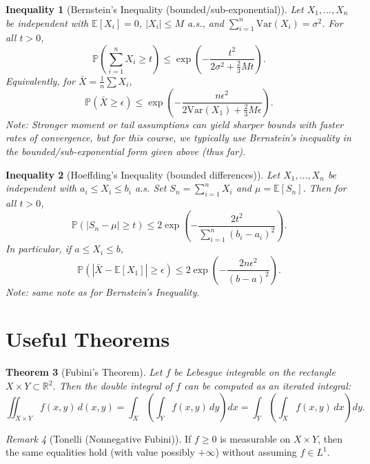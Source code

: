 \documentclass[11pt]{article}
\theoremstyle{plain}
\newtheorem{theorem}{Theorem}[section]
\newtheorem{inequality}[theorem]{Inequality}
\theoremstyle{definition}
\theoremstyle{remark}
\newtheorem{remark}[theorem]{Remark}
\newcommand{\E}{\mathbb{E}}
\newcommand{\Var}{\mathrm{Var}}
\newcommand{\1}{\mathbbm{1}}
\begin{document}
\vspace{1em}

\begin{inequality}[Bernstein’s Inequality (bounded/sub-exponential)]
Let $X_1,\dots,X_n$ be independent with $\E[X_i]=0$, $|X_i|\le M$ a.s., and $\sum_{i=1}^n \Var(X_i)=\sigma^2$. For all $t>0$,
\[
\mathbb{P}\!\left(\sum_{i=1}^n X_i \ge t\right)
\le \exp\!\left(-\frac{t^2}{2\sigma^2 + \tfrac{2}{3}Mt}\right).
\]
Equivalently, for $\bar X=\tfrac1n\sum X_i$,
\[
\mathbb{P}\!\left(\bar X \ge \epsilon\right)
\le \exp\!\left(-\frac{n\epsilon^2}{2\Var(X_1)+ \tfrac{2}{3}M\epsilon}\right).
\]
\noindent Note: Stronger moment or tail assumptions can yield sharper bounds with faster rates of convergence, but for this course, we typically use Bernstein’s inequality in the bounded/sub-exponential form given above (thus far).
\end{inequality}

\vspace{1em}

\begin{inequality}[Hoeffding’s Inequality (bounded differences)]
Let $X_1,\dots,X_n$ be independent with $a_i\le X_i\le b_i$ a.s. Set $S_n=\sum_{i=1}^n X_i$ and $\mu=\E[S_n]$. Then for all $t>0$,
\[
\mathbb{P}\!\left(|S_n-\mu|\ge t\right)
\le 2\exp\!\left(-\frac{2t^2}{\sum_{i=1}^n (b_i-a_i)^2}\right).
\]
In particular, if $a\le X_i\le b$,
\[
\mathbb{P}\!\left(|\bar X-\E[X_1]|\ge \epsilon\right)
\le 2\exp\!\left(-\frac{2n\epsilon^2}{(b-a)^2}\right).
\]
\noindent Note: same note as for Bernstein's Inequality.
\end{inequality}

\newpage 

\section{Useful Theorems}

\begin{theorem}[Fubini’s Theorem]
Let $f$ be Lebesgue integrable on the rectangle $X \times Y \subset \mathbb{R}^2$. 
Then the double integral of $f$ can be computed as an iterated integral:
\[
\iint_{X \times Y} f(x,y)\, d(x,y)
= \int_X \!\left( \int_Y f(x,y)\, dy \right) dx
= \int_Y \!\left( \int_X f(x,y)\, dx \right) dy.
\]
\end{theorem}

\begin{remark}[Tonelli (Nonnegative Fubini)]
If $f\ge 0$ is measurable on $X\times Y$, then the same equalities hold (with value possibly $+\infty$) without assuming $f\in L^1$.
\end{remark}
\end{document}
